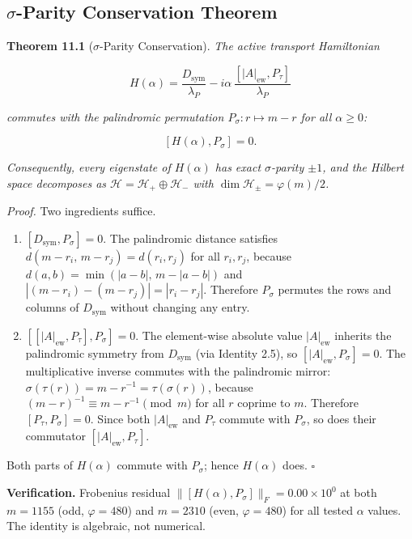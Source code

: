 \documentclass[11pt,letterpaper]{article}
\theoremstyle{definition}
\theoremstyle{remark}
\begin{document}
\subsection{$\sigma$-Parity Conservation Theorem}\label{sigma-parity-conservation-theorem}

\textbf{Theorem 11.1} ($\sigma$-Parity Conservation). \emph{The active transport Hamiltonian}

\[H(\alpha) = \frac{D_{\text{sym}}}{\lambda_P} - i\alpha\,\frac{[|A|_{\text{ew}}, P_\tau]}{\lambda_P}\]

\emph{commutes with the palindromic permutation $P_\sigma: r \mapsto m - r$ for all $\alpha \geq 0$:}

\[[H(\alpha), P_\sigma] = 0.\]

\emph{Consequently, every eigenstate of $H(\alpha)$ has exact $\sigma$-parity $\pm 1$, and the Hilbert space decomposes as $\mathcal{H} = \mathcal{H}_+ \oplus \mathcal{H}_-$ with $\dim \mathcal{H}_\pm = \varphi(m)/2$.}

\emph{Proof.} Two ingredients suffice.

\begin{enumerate}
\def\labelenumi{(\roman{enumi})}
\item
  $[D_{\text{sym}}, P_\sigma] = 0$. The palindromic distance satisfies $d(m{-}r_i,\, m{-}r_j) = d(r_i, r_j)$ for all $r_i, r_j$, because $d(a,b) = \min(|a-b|,\, m - |a-b|)$ and $|(m-r_i)-(m-r_j)| = |r_i - r_j|$. Therefore $P_\sigma$ permutes the rows and columns of $D_{\text{sym}}$ without changing any entry.
\item
  $[[|A|_{\text{ew}}, P_\tau], P_\sigma] = 0$. The element-wise absolute value $|A|_{\text{ew}}$ inherits the palindromic symmetry from $D_{\text{sym}}$ (via Identity 2.5), so $[|A|_{\text{ew}}, P_\sigma] = 0$. The multiplicative inverse commutes with the palindromic mirror: $\sigma(\tau(r)) = m - r^{-1} = \tau(\sigma(r))$, because $(m - r)^{-1} \equiv m - r^{-1} \pmod{m}$ for all $r$ coprime to $m$. Therefore $[P_\tau, P_\sigma] = 0$. Since both $|A|_{\text{ew}}$ and $P_\tau$ commute with $P_\sigma$, so does their commutator $[|A|_{\text{ew}}, P_\tau]$.
\end{enumerate}

Both parts of $H(\alpha)$ commute with $P_\sigma$; hence $H(\alpha)$ does. $\square$

\textbf{Verification.} Frobenius residual $\|[H(\alpha), P_\sigma]\|_F = 0.00 \times 10^{0}$ at both $m = 1155$ (odd, $\varphi = 480$) and $m = 2310$ (even, $\varphi = 480$) for all tested $\alpha$ values. The identity is algebraic, not numerical.
\end{document}
